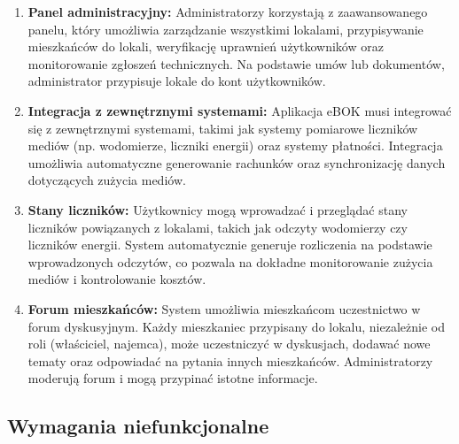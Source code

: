 \begin{enumerate}[label=\arabic*.]
	\item \textbf{Panel administracyjny:} Administratorzy korzystają z zaawansowanego panelu, który umożliwia zarządzanie wszystkimi lokalami, przypisywanie mieszkańców do lokali, weryfikację uprawnień użytkowników oraz monitorowanie zgłoszeń technicznych. Na podstawie umów lub dokumentów, administrator przypisuje lokale do kont użytkowników.

	\item \textbf{Integracja z zewnętrznymi systemami:} Aplikacja eBOK musi integrować się z zewnętrznymi systemami, takimi jak systemy pomiarowe liczników mediów (np. wodomierze, liczniki energii) oraz systemy płatności. Integracja umożliwia automatyczne generowanie rachunków oraz synchronizację danych dotyczących zużycia mediów.

	\item \textbf{Stany liczników:} Użytkownicy mogą wprowadzać i przeglądać stany liczników powiązanych z lokalami, takich jak odczyty wodomierzy czy liczników energii. System automatycznie generuje rozliczenia na podstawie wprowadzonych odczytów, co pozwala na dokładne monitorowanie zużycia mediów i kontrolowanie kosztów.

	\item \textbf{Forum mieszkańców:} System umożliwia mieszkańcom uczestnictwo w forum dyskusyjnym. Każdy mieszkaniec przypisany do lokalu, niezależnie od roli (właściciel, najemca), może uczestniczyć w dyskusjach, dodawać nowe tematy oraz odpowiadać na pytania innych mieszkańców. Administratorzy moderują forum i mogą przypinać istotne informacje.

\end{enumerate}

\subsection{Wymagania niefunkcjonalne}

